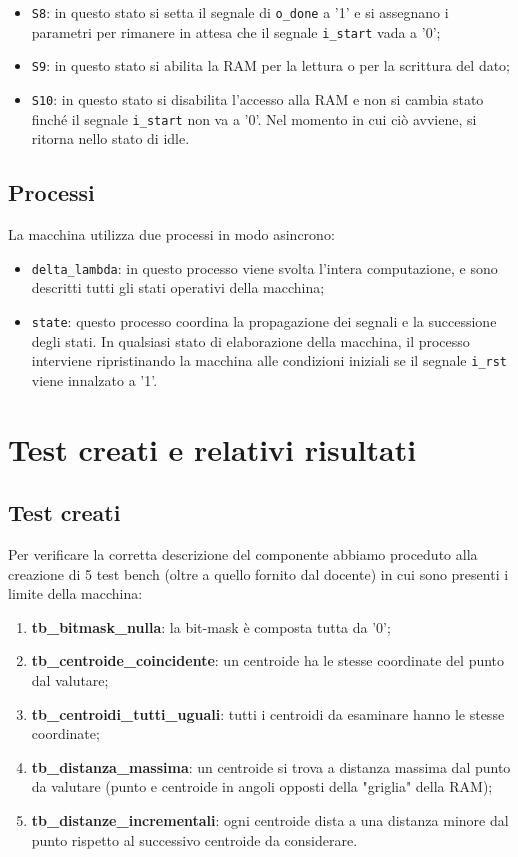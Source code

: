 \documentclass[a4paper,12pt]{article}
\begin{document}
\begin{itemize}
\item \texttt{S8}: in questo stato si setta il segnale di \texttt{o\_done} a '1' e si assegnano i parametri per rimanere in attesa che il segnale \texttt{i\_start} vada a '0';
\item \texttt{S9}: in questo stato si abilita la RAM per la lettura o per la scrittura del dato;
\item \texttt{S10}: in questo stato si disabilita l'accesso alla RAM e non si cambia stato finché il segnale \texttt{i\_start} non va a '0'. Nel momento in cui ciò avviene, si ritorna nello stato di idle.
\end{itemize}

\subsection{Processi}
La macchina utilizza due processi in modo asincrono:
\begin{itemize}
\item \texttt{delta\_lambda}: in questo processo viene svolta l'intera computazione, e sono descritti tutti gli stati operativi della macchina;
\item \texttt{state}: questo processo coordina la propagazione dei segnali e la successione degli stati. In qualsiasi stato di elaborazione della macchina, il processo interviene ripristinando la macchina alle condizioni iniziali se il segnale \texttt{i\_rst} viene innalzato a '1'.
\end{itemize}

\section{Test creati e relativi risultati}

\subsection{Test creati}
Per verificare la corretta descrizione del componente abbiamo proceduto alla creazione di 5 test bench (oltre a quello fornito dal docente) in cui sono presenti i limite della macchina:
\begin{enumerate}
\item \textbf{tb\_bitmask\_nulla}: la bit-mask è composta tutta da '0';
\item \textbf{tb\_centroide\_coincidente}: un centroide ha le stesse coordinate del punto dal valutare;
\item \textbf{tb\_centroidi\_tutti\_uguali}: tutti i centroidi da esaminare hanno le stesse coordinate;
\item \textbf{tb\_distanza\_massima}: un centroide si trova a distanza massima dal punto da valutare (punto e centroide in angoli opposti della "griglia" della RAM);
\item \textbf{tb\_distanze\_incrementali}: ogni centroide dista a una distanza minore dal punto rispetto al successivo centroide da considerare.
\end{enumerate}
\end{document}
